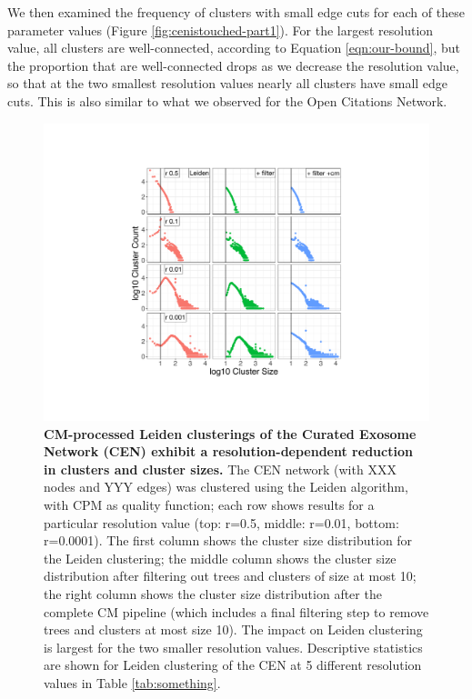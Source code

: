 \documentclass[11pt]{article}   	%
\begin{document}
We then examined the frequency of   clusters with small edge cuts for each of these parameter values (Figure \ref{fig:cenistouched-part1}).
For the largest resolution value, all clusters are well-connected, according to Equation \ref{eqn:our-bound}, but the proportion that are well-connected drops as we decrease the resolution value, so that at the two smallest resolution values nearly all clusters have small edge cuts.
This is also similar to what we observed for the Open Citations Network.

\begin{figure}[H]
\centering
\includegraphics[width=0.8\linewidth]{figs/fig2_kn.pdf}
\caption{\textbf{CM-processed Leiden clusterings of the Curated Exosome Network (CEN) exhibit a resolution-dependent reduction in clusters and cluster sizes.}
The CEN network (with XXX nodes and YYY edges) was clustered using the Leiden algorithm, with CPM as quality function; each row shows results for a particular resolution value (top: r=0.5, middle: r=0.01, bottom: r=0.0001).
The first column shows the cluster size distribution for the Leiden clustering; the middle column shows the cluster size distribution after filtering out trees and clusters of size at most 10; the right column shows the cluster size distribution after the complete CM pipeline (which includes a final filtering step to remove trees and clusters at most size 10).
The impact on Leiden clustering is largest for the two smaller resolution values.
Descriptive statistics are shown for Leiden clustering of the CEN at 5 different resolution values in Table \ref{tab:something}.}
\label{fig:CEN_size_count_plots_leiden}
\end{figure}
\end{document}
